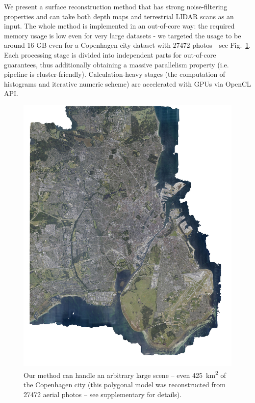 \documentclass[10pt,twocolumn,letterpaper]{article}
\begin{document}
We present a surface reconstruction method that has strong noise-filtering properties and can take both depth maps and terrestrial LIDAR scans as an input.
The whole method is implemented in an out-of-core way: the required memory usage is low even for very large datasets - we targeted the usage to be around 16 GB even for a Copenhagen city dataset with 27472 photos - see Fig.~\ref{fig:copenhagen_full_rgb}.
Each processing stage is divided into independent parts for out-of-core guarantees,
thus additionally obtaining a massive parallelism property (i.e. pipeline is cluster-friendly).
Calculation-heavy stages (the computation of histograms and iterative numeric scheme) are accelerated with GPUs via OpenCL API.


\begin{figure}
    \centering
    \capstart
    \begin{minipage}[b]{\linewidth}
        \includegraphics[width=\textwidth]{images/copenhagen/results/full/full_rgb.jpg}
    \end{minipage}
    \caption{Our method can handle an arbitrary large scene -- even \SI{425}{\km\squared} of the Copenhagen city
    (this polygonal model was reconstructed from 27472 aerial photos -- see supplementary for details).}
    \label{fig:copenhagen_full_rgb}
\end{figure}
\end{document}

